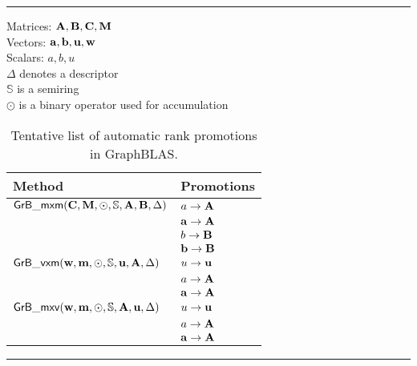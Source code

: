 \begin{table}[htb]
	\hrule
	\caption{Tentative list of automatic rank promotions in GraphBLAS.}
	\label{Tab:promotions}
	Matrices: ${\bf A},{\bf B},{\bf C},{\bf M}$ \\
	Vectors: ${\bf a},{\bf b},{\bf u},{\bf w}$ \\
	Scalars: $a,b,u$ \\
	$\Delta$ denotes a descriptor \\
	$\mathbb{S}$ is a semiring \\
	$\odot$ is a binary operator used for accumulation \\
	\begin{center}
		\begin{tabular}{|l|l|} \hline
			Method		& Promotions \\ \hline
			${\sf GrB\_mxm}({\bf C},{\bf M},\odot,\mathbb{S},{\bf A},{\bf B},\Delta)$	& $a \rightarrow {\bf A}$ \\
														& ${\bf a} \rightarrow {\bf A}$ \\
														& $b \rightarrow {\bf B}$ \\
														& ${\bf b} \rightarrow {\bf B}$ \\
			\hline
			${\sf GrB\_vxm}({\bf w},{\bf m},\odot,\mathbb{S},{\bf u},{\bf A},\Delta)$	& $u \rightarrow {\bf u}$ \\
														& $a \rightarrow {\bf A}$ \\
                                                                                                                & ${\bf a} \rightarrow {\bf A}$ \\
			\hline
			${\sf GrB\_mxv}({\bf w},{\bf m},\odot,\mathbb{S},{\bf A},{\bf u},\Delta)$	& $u \rightarrow {\bf u}$ \\
														& $a \rightarrow {\bf A}$ \\
                                                                                                                & ${\bf a} \rightarrow {\bf A}$ \\
			\hline
		\end{tabular}
	\end{center}
	\hrule
\end{table}
